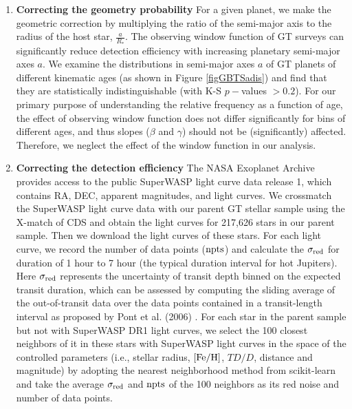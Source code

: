\documentclass[twocolumn]{pnas-new}
\begin{document}
\begin{enumerate}
  \item \textbf{Correcting the geometry probability} 
 For a given planet, we make the geometric correction by multiplying the ratio of the semi-major axis to the radius of the host star, $\frac{a}{R_*}$. The observing window function of GT surveys can significantly reduce detection efficiency with increasing planetary semi-major axes $a$. We examine the distributions in semi-major axes $a$ of GT planets of different kinematic ages (as shown in Figure \ref{figGBTSadis}) and find that they are statistically indistinguishable (with K-S $p-$values $>0.2$).
For our primary purpose of understanding the relative frequency as a function of age, the effect of observing window function does not differ significantly for bins of different ages, and thus slopes ($\beta$ and $\gamma$) should not be (significantly) affected. Therefore, we neglect the effect of the window function in our analysis.

   
  \item \textbf{Correcting the detection efficiency} 
  The NASA Exoplanet Archive provides access to the public SuperWASP light curve data release 1, which contains RA, DEC, apparent magnitudes, and light curves.
  We crossmatch the SuperWASP light curve data with our parent GT stellar sample using the X-match of CDS and obtain the light curves for 217,626 stars in our parent sample.
  Then we download the light curves of these stars.
  For each light curve, we record the number of data points ($\rm npts$) and calculate the $\sigma_{\rm red}$ for duration of 1 hour to 7 hour (the typical duration interval for hot Jupiters).
  Here $\sigma_{\rm red}$ represents the uncertainty of transit depth binned on the expected transit duration, which can be assessed by computing the sliding average of the out-of-transit data over the data points contained in a transit-length interval as proposed by Pont et al. (2006) \citep{2006MNRAS.373..231P}.
  For each star in the parent sample but not with SuperWASP DR1 light curves, we select the 100 closest neighbors of it in these stars with SuperWASP light curves in the space of the controlled parameters (i.e., stellar radius, $\rm [Fe/H]$, $TD/D$, distance and magnitude) by adopting the nearest neighborhood method from scikit-learn \citep{10.5555/1953048.2078195} and take the average $\sigma_{\rm red}$ and $\rm npts$ of the 100 neighbors as its red noise and number of data points.


\end{enumerate}
\end{document}
